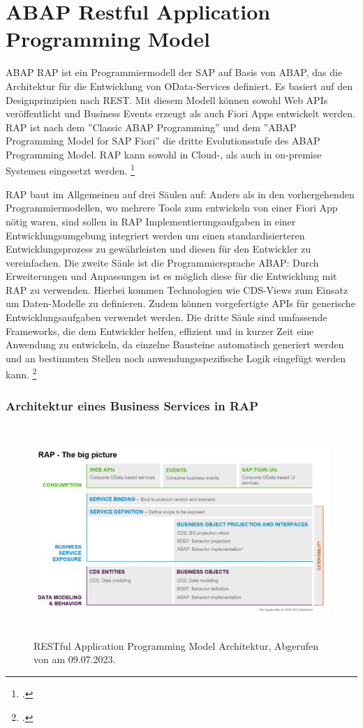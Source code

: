 \section{ABAP Restful Application Programming Model}

ABAP RAP ist ein Programmiermodell der SAP auf Basis von ABAP, das die Architektur für die Entwicklung von OData-Services definiert. Es basiert auf den Designprinzipien nach REST. Mit diesem Modell können sowohl Web APIs veröffentlicht und Business Events erzeugt als auch Fiori Apps entwickelt werden. RAP ist nach dem ''Classic ABAP Programming'' und dem ''ABAP Programming Model for SAP Fiori'' die dritte Evolutionsstufe des ABAP Programming Model. RAP kann sowohl in Cloud-, als auch in on-premise Systemen eingesetzt werden. \footcite[Vgl.][]{sap_rap_2023}

RAP baut im Allgemeinen auf drei Säulen auf: Anders als in den vorhergehenden Programmiermodellen, wo mehrere Tools zum entwickeln von \zB einer Fiori App nötig waren, sind sollen in RAP Implementierungsaufgaben in einer Entwicklungsumgebung integriert werden um einen standardisierteren Entwicklungsprozess zu gewährleisten und diesen für den Entwickler zu vereinfachen. Die zweite Säule ist die Programmiersprache ABAP: Durch Erweiterungen und Anpassungen ist es möglich diese für die Entwicklung mit RAP zu verwenden. Hierbei kommen Technologien wie CDS-Views zum Einsatz um Daten-Modelle zu definieren. Zudem können vorgefertigte APIs für generische Entwicklungsaufgaben verwendet werden. Die dritte Säule sind umfassende Frameworks, die dem Entwickler helfen, effizient und in kurzer Zeit eine Anwendung zu entwickeln, da einzelne Bausteine automatisch generiert werden und an bestimmten Stellen noch anwendungsspezifische Logik eingefügt werden kann. \footcite[Vgl.][]{sap_rap_2023}

\subsubsection{Architektur eines Business Services in RAP}

\begin{figure}[H]
 \centering
 \includegraphics[height=8cm]{Bilder/RAP_Architektur.png}
 \caption[RESTful Application Programming Model Architektur]{RESTful Application Programming Model Architektur, Abgerufen von \cite{sap_rap_2023} am 09.07.2023.}
 \label{fig:iso_norm}
\end{figure}

